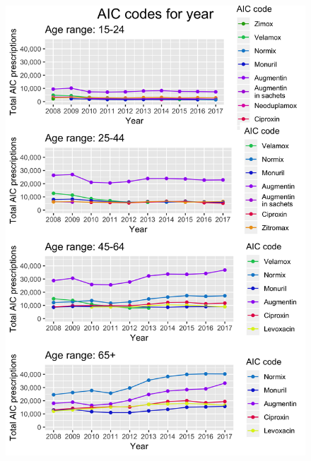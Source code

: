 \begin{figure}[h]
	\centering
	\includegraphics[scale=0.29]{../plots/top_aic_age-year.png}
\end{figure}

